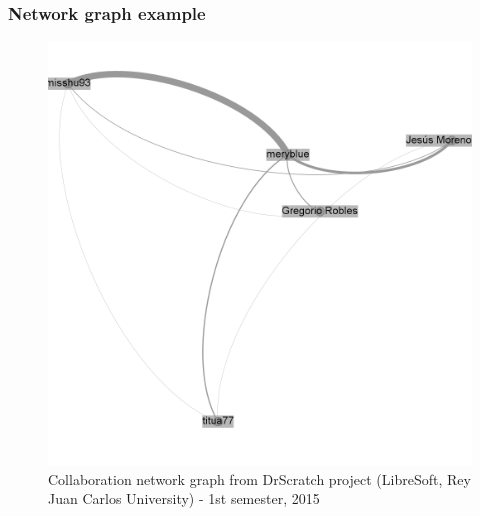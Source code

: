 \documentclass{beamer}
\begin{document}

\begin{frame}
\frametitle{Network graph example}
\begin{figure}
\includegraphics[scale=0.18]{example-graph1.png}
\caption{Collaboration network graph from DrScratch project 
(LibreSoft, Rey Juan Carlos University) - 1st semester, 2015}
\end{figure}
\end{frame}

\end{document}
